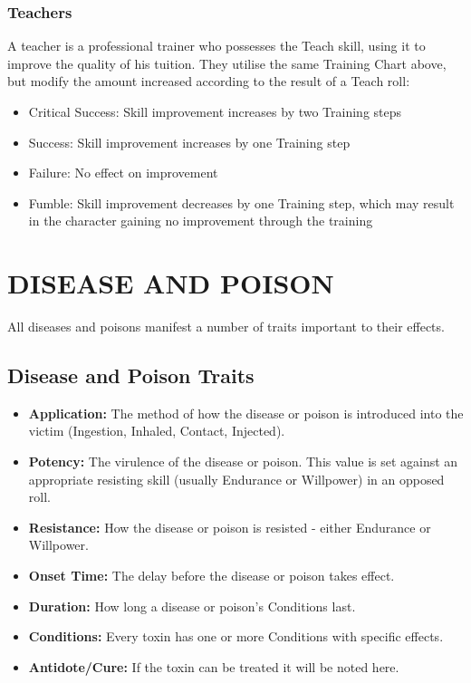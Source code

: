\documentclass[10pt]{article}
\begin{document}
\subsubsection{Teachers}
\label{sec:teachers}
A teacher is a professional trainer who possesses the Teach skill, using it to improve the quality of his tuition. They utilise the same Training Chart above, but modify the amount increased according to the result of a Teach roll:
\begin{itemize}[leftmargin=*]
    \item Critical Success: Skill improvement increases by two Training steps
    \item Success: Skill improvement increases by one Training step
    \item Failure: No effect on improvement
    \item Fumble: Skill improvement decreases by one Training step, which may result in the character gaining no improvement through the training
\end{itemize}

\section{DISEASE AND POISON}
\label{sec:disease-poison}
All diseases and poisons manifest a number of traits important to their effects.

\subsection{Disease and Poison Traits}
\begin{itemize}[leftmargin=*]
    \item \textbf{Application:} The method of how the disease or poison is introduced into the victim (Ingestion, Inhaled, Contact, Injected).
    \item \textbf{Potency:} The virulence of the disease or poison. This value is set against an appropriate resisting skill (usually Endurance or Willpower) in an opposed roll.
    \item \textbf{Resistance:} How the disease or poison is resisted - either Endurance or Willpower.
    \item \textbf{Onset Time:} The delay before the disease or poison takes effect.
    \item \textbf{Duration:} How long a disease or poison's Conditions last.
    \item \textbf{Conditions:} Every toxin has one or more Conditions with specific effects.
    \item \textbf{Antidote/Cure:} If the toxin can be treated it will be noted here.
\end{itemize}
\end{document}
